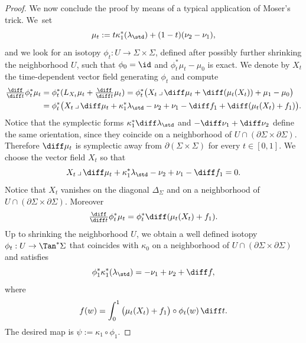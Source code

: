 \begin{proof}
We now conclude the proof by means of a typical application of Moser's trick. We~set
\[
\mu_t:=t\kappa_1^*(\lambda_{\std}) + (1-t)(\nu_2-\nu_1),
\]
and we look for an isotopy $\phi_t:U\to\Sigma\times\Sigma$, defined after possibly further shrinking the neighborhood $U$, such that $\phi_0=\id$ and $\phi_t^*\mu_t-\mu_0$ is exact. We denote by $X_t$ the time-dependent vector field generating $\phi_t$ and compute
\begin{align*}
\tfrac{\diff}{\diff t}\phi_t^*\mu_t
&=\phi_t^* ( L_{X_t} \mu_t + \tfrac{\diff}{\diff t} \mu_t) = \phi_t^*\big( X_t\,\lrcorner\,\diff\mu_t + \diff(\mu_t(X_t))+ \mu_1-\mu_0 \big)\\
&=\phi_t^*\big( X_t\,\lrcorner\,\diff\mu_t + \kappa_1^*\lambda_{\std}-\nu_2+\nu_1-\diff f_1 + \diff(\mu_t(X_t)+f_1)\big).
\end{align*}
Notice that the symplectic forms $\kappa_1^*\diff\lambda_{\std}$ and $-\diff\nu_1+\diff\nu_2$ define the same orientation, since they coincide on a neighborhood of $U\cap(\partial\Sigma\times\partial\Sigma)$. Therefore $\diff\mu_t$ is symplectic away from $\partial(\Sigma\times \Sigma)$ for every $t\in[0,1]$. We choose the vector field $X_t$ so that
\[
X_t\,\lrcorner\,\diff\mu_t + \kappa_1^*\lambda_{\std}-\nu_2+\nu_1-\diff f_1
=
0.
\]
Notice that $X_t$ vanishes on the diagonal $\Delta_\Sigma$ and on a neighborhood of $U\cap(\partial\Sigma\times\partial\Sigma)$.
Moreover
\[
\tfrac{\diff}{\diff t}\phi_t^*\mu_t
=
\phi_t^*\diff(\mu_t(X_t)+f_1).
\]
Up to shrinking the neighborhood $U$, we obtain a well defined isotopy $\phi_t:U\to\Tan^*\Sigma$ that coincides with $\kappa_0$ on a neighborhood of $U\cap(\partial\Sigma\times\partial\Sigma)$ and satisfies
\[
\phi_1^*\kappa_1^*(\lambda_{\std})=-\nu_1+\nu_2 + \diff f,
\]
where
\[
f(w)=\int_0^1 \big(\mu_t(X_t)+f_1\big)\circ\phi_t(w)\,\diff t.
\]
The desired map is $\psi:=\kappa_1\circ\phi_1$.
\end{proof}

